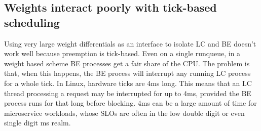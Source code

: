 \subsection{Weights interact poorly with tick-based
scheduling}\label{ss:problem:quantum}

Using very large weight differentials as an interface to isolate LC and BE
doesn't work well because preemption is tick-based. Even on a single runqueue,
in a weight based scheme BE processes get a fair share of the CPU. The problem
is that, when this happens, the BE process will interrupt any running LC process
for a whole tick. In Linux, hardware ticks are 4ms long. This means that an LC
thread processing a request may be interrupted for up to 4ms, provided the BE
process runs for that long before blocking. 4ms can be a large amount of time
for microservice workloads, whose SLOs are often in the low double digit or even
single digit ms realm.~\cite{in-the-plex, sigmaos}



